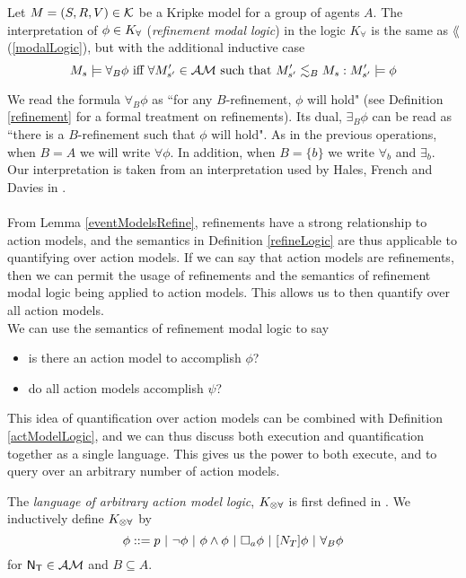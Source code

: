 \begin{defn} \label{refineLogic}
Let $M = (S, R, V) \in \mathcal{K}$ be a Kripke model for a group of agents $A$.
The interpretation of $\phi \in K_{\forall}$ ({\em refinement modal logic}) in the logic $K_\forall$ is the same as $\lang$
(\ref{modalLogic}), but with the additional inductive case
\[
	M_s \models \forall_B \phi \text{ iff } \forall M'_{s'} \in
  \mathcal{AM} \text{ such that } M'_{s'}
	\lesssim_B M_s : M'_{s'} \models \phi
\]
\end{defn}

We read the formula $\forall_B \phi$ as ``for any $B$-refinement, $\phi$ will hold" (see Definition
\ref{refinement} for a formal treatment on refinements).
Its dual, $\exists_B \phi$ can be read as ``there is a $B$-refinement such that $\phi$ will hold".
As in the previous operations, when $B = A$ we will write $\forall \phi$.
In addition, when $B = \{b\}$ we write $\forall_b$ and $\exists_b$.
Our interpretation is taken from an interpretation used by Hales, French and Davies in
\cite{hales2012refinement}.\\
\\
From Lemma \ref{eventModelsRefine}, refinements have a strong relationship to action models,
and the semantics in Definition \ref{refineLogic} are thus applicable to
quantifying over action models.
If we can say that action models are refinements, then we can permit the usage of refinements and the
semantics of refinement modal logic being applied to action models.
This allows us to then quantify over all action models.\\
We can use the semantics of refinement modal logic to say

\begin{itemize}
	\item is there an action model to accomplish $\phi$?	
	\item do all action models accomplish $\psi$?
\end{itemize}

This idea of quantification over action models can be combined with Definition \ref{actModelLogic},
and we can thus discuss both execution and quantification together as a single language.
This gives us the power to both execute, and to query over an arbitrary number of action models.

\begin{defn} \label{arbActLogic}
	The {\em language of arbitrary action model logic}, $K_{\otimes\forall}$ is first defined in \cite{hales13synthesis}.
We inductively define $K_{\otimes\forall}$ by
\[
	\phi ::= p \text{ } | \text{ } \neg \phi \text{ } | \text{ } \phi \land \phi \text{ } | \text{ } \Box_a \phi \text{ } |
  \text{ }[{N_T}] \phi \text{ } | \text{ } \forall_B \phi
\]
for $\mathrm{\mathsf{\mathrm{\mathsf{N}}_T}} \in \mathcal{AM}$ and $B \subseteq A$.
\end{defn}

